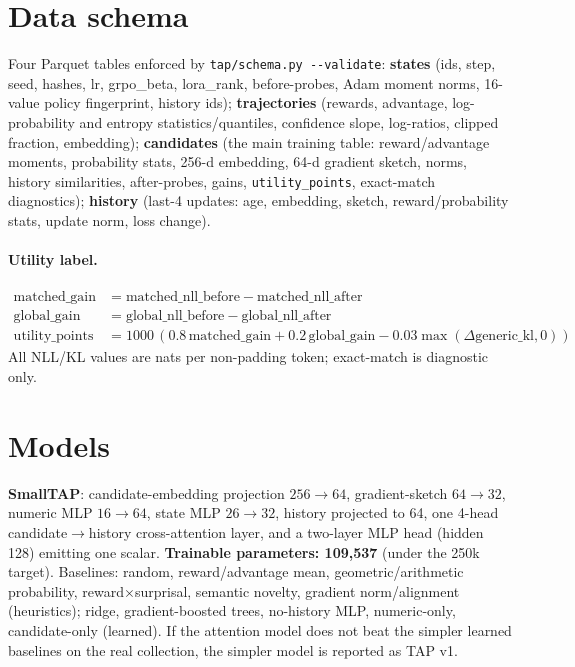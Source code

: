 \documentclass[11pt]{article}
\begin{document}
\section{Data schema}
Four Parquet tables enforced by \texttt{tap/schema.py -{}-validate}: \textbf{states}
(ids, step, seed, hashes, lr, grpo\_beta, lora\_rank, before-probes, Adam moment
norms, 16-value policy fingerprint, history ids); \textbf{trajectories} (rewards,
advantage, log-probability and entropy statistics/quantiles, confidence slope,
log-ratios, clipped fraction, embedding); \textbf{candidates} (the main training
table: reward/advantage moments, probability stats, 256-d embedding, 64-d gradient
sketch, norms, history similarities, after-probes, gains, \texttt{utility\_points},
exact-match diagnostics); \textbf{history} (last-4 updates: age, embedding, sketch,
reward/probability stats, update norm, loss change).

\paragraph{Utility label.}
\begin{align*}
\text{matched\_gain} &= \text{matched\_nll\_before} - \text{matched\_nll\_after}\\
\text{global\_gain}  &= \text{global\_nll\_before}  - \text{global\_nll\_after}\\
\text{utility\_points} &= 1000\,(0.8\,\text{matched\_gain} + 0.2\,\text{global\_gain}
 - 0.03\max(\Delta\text{generic\_kl}, 0))
\end{align*}
All NLL/KL values are nats per non-padding token; exact-match is diagnostic only.

\section{Models}
\textbf{SmallTAP}: candidate-embedding projection $256\to64$, gradient-sketch
$64\to32$, numeric MLP $16\to64$, state MLP $26\to32$, history projected to 64, one
4-head candidate$\to$history cross-attention layer, and a two-layer MLP head
(hidden 128) emitting one scalar. \textbf{Trainable parameters: 109{,}537} (under
the 250k target). Baselines: random, reward/advantage mean, geometric/arithmetic
probability, reward$\times$surprisal, semantic novelty, gradient norm/alignment
(heuristics); ridge, gradient-boosted trees, no-history MLP, numeric-only,
candidate-only (learned). If the attention model does not beat the simpler learned
baselines on the real collection, the simpler model is reported as TAP v1.
\end{document}
